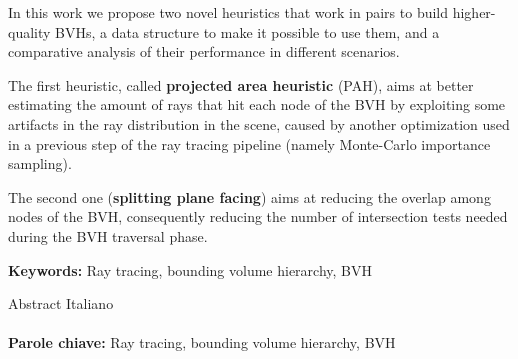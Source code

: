 \documentclass{PoliMi_MasterThesis}
\begin{document}
In this work we propose two novel heuristics that work in pairs to build higher-quality BVHs, a data structure to make it possible to use them, and a comparative analysis of their performance in different scenarios.

The first heuristic, called \textbf{projected area heuristic} (PAH), aims at better estimating the amount of rays that hit each node of the BVH by exploiting some artifacts in the ray distribution in the scene, caused by another optimization used in a previous step of the ray tracing pipeline (namely Monte-Carlo importance sampling).

The second one (\textbf{splitting plane facing}) aims at reducing the overlap among nodes of the BVH, consequently reducing the number of intersection tests needed during the BVH traversal phase.

\textbf{Keywords:} Ray tracing, bounding volume hierarchy, BVH
\normalsize

\makeatletter
\let\savedchap\@makechapterhead
\def\@makechapterhead{\vspace*{-3cm}\savedchap}
\let\@makechapterhead\savedchap
\makeatletter
\small
Abstract Italiano
\\
\\
\textbf{Parole chiave:} Ray tracing, bounding volume hierarchy, BVH
\normalsize


\thispagestyle{empty}
\tableofcontents %
\thispagestyle{empty}
\cleardoublepage

\mainmatter %

\end{document}
